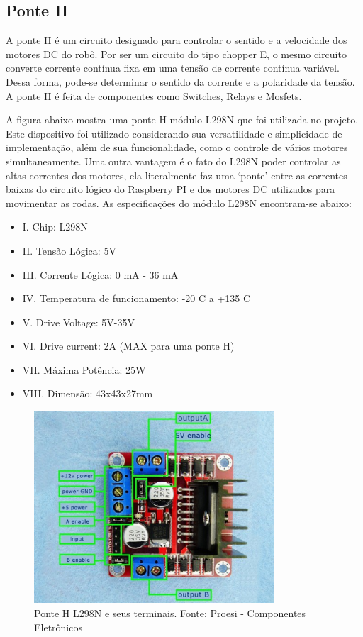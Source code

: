 \subsection{Ponte H}

A ponte H é um circuito designado para controlar o sentido e a velocidade dos motores DC do robô. Por ser um circuito do tipo chopper E,
o mesmo circuito converte corrente contínua fixa em uma tensão de corrente contínua variável. Dessa forma, pode-se determinar o sentido da
corrente e a polaridade da tensão. A ponte H é feita de componentes como Switches, Relays e Mosfets.

A figura abaixo mostra uma ponte H módulo L298N que foi utilizada no projeto. Este dispositivo foi utilizado considerando sua versatilidade
e simplicidade de implementação, além de sua funcionalidade, como o controle de vários motores simultaneamente. Uma outra vantagem é o fato
do L298N poder controlar as altas correntes dos motores, ela literalmente faz uma ‘ponte’ entre as correntes baixas do circuito lógico do
Raspberry PI e dos motores DC utilizados para movimentar as rodas. As especificações do módulo L298N encontram-se abaixo:

\begin{itemize}
    \item I. Chip: L298N
    \item II. Tensão Lógica: 5V
    \item III. Corrente Lógica: 0 mA - 36 mA
    \item IV. Temperatura de funcionamento: -20 C a +135 C
    \item V. Drive Voltage: 5V-35V
    \item VI. Drive current: 2A (MAX para uma ponte H)
    \item VII. Máxima Potência: 25W
    \item VIII. Dimensão: 43x43x27mm
\end{itemize}

\begin{figure}[H]
    \centering
    \includegraphics[width=0.8\textwidth]{figuras/ponteH.eps}
    \caption{Ponte H L298N e seus terminais. Fonte: Proesi - Componentes Eletrônicos}
    \label{fig:ponteH}
\end{figure}

